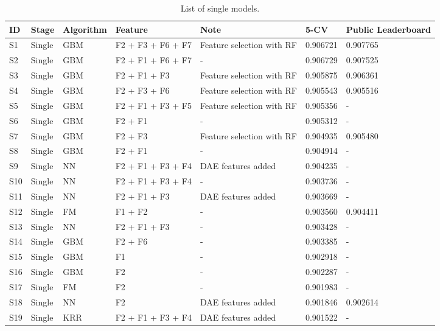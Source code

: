 \begin{table*}
\begin{center}
    \begin{minipage}{\textwidth}
    {
    \caption{List of single models.}
      \small
      \hfill{}
\begin{tabular}{lllllll}
ID	& Stage	& Algorithm 	& Feature				& Note					& 5-CV		& Public Leaderboard \\ 
\hline
S1 	& Single	& GBM 		& F2 + F3 + F6 + F7		& Feature selection with RF	& 0.906721	& 0.907765 \\
S2 	& Single 	& GBM		& F2 + F1 + F6 + F7 		& -						& 0.906729	& 0.907525\\
S3 	& Single	& GBM  		& F2 + F1 + F3 			& Feature selection with RF	& 0.905875 	& 0.906361 \\
S4 	& Single	& GBM		& F2 + F3 + F6			& Feature selection with RF	& 0.905543	& 0.905516 \\
S5 	& Single	& GBM		& F2 + F1 + F3 + F5		& Feature selection with RF	& 0.905356	& - \\
S6	& Single	& GBM		& F2 + F1				& -						& 0.905312	& - \\
S7	& Single	& GBM		& F2 + F3				& Feature selection with RF	& 0.904935	& 0.905480 \\
S8	& Single	& GBM		& F2 + F1				& -						& 0.904914	& - \\
S9	& Single	& NN		& F2 + F1 + F3 + F4 		& DAE features	 added		& 0.904235 	& - \\
S10	& Single	& NN	 	& F2 + F1 + F3 + F4 		& -						& 0.903736 	& - \\
S11	& Single	& NN	 	& F2 + F1 + F3 			& DAE features	 added		& 0.903669	& - \\
S12	& Single	& FM 		& F1 + F2 			& -						& 0.903560	& 0.904411 \\
S13	& Single	& NN		& F2 + F1 + F3 			& -						& 0.903428	& - \\
S14	& Single	& GBM		& F2 + F6				& -						& 0.903385	& - \\
S15 	& Single	& GBM		& F1					& -						& 0.902918	& - \\
S16 	& Single	& GBM		& F2 				& - 						& 0.902287	& - \\
S17	& Single	& FM		& F2					& -						& 0.901983	& - \\
S18	& Single	& NN		& F2					& DAE features	 added		& 0.901846	& 0.902614 \\
S19	& Single	& KRR		& F2 + F1 + F3 + F4		& DAE features	 added		& 0.901522	& - \\

\end{tabular}}
\end{minipage}
\end{center}
\end{table*}
